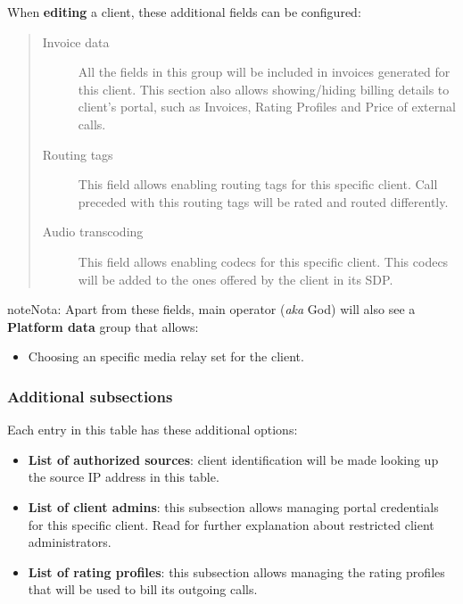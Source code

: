 \documentclass[letterpaper,10pt,spanish]{sphinxmanual}
\begin{document}
When \textbf{editing} a client, these additional fields can be configured:
\begin{quote}
\begin{description}
\item[{Invoice data}] \leavevmode
All the fields in this group will be included in invoices generated for this client. This section also allows
showing/hiding billing details to client's portal, such as Invoices, Rating Profiles and Price of external calls.

\item[{Routing tags}] \leavevmode
This field allows enabling routing tags for this specific client. Call preceded with this
routing tags will be rated and routed differently.

\item[{Audio transcoding}] \leavevmode
This field allows enabling codecs for this specific client. This codecs will be added to
the ones offered by the client in its SDP.

\end{description}
\end{quote}

\begin{notice}{note}{Nota:}
Apart from these fields, main operator (\emph{aka} God) will also see a \textbf{Platform data} group that allows:
\begin{itemize}
\item {} 
Choosing an specific media relay set for the client.

\end{itemize}
\end{notice}


\subsubsection{Additional subsections}
\label{administration_portal/brand/clients/wholesale:additional-subsections}
Each entry in this table has these additional options:
\begin{itemize}
\item {} 
\textbf{List of authorized sources}: client identification will be made looking up the source IP address in this table.

\item {} 
\textbf{List of client admins}: this subsection allows managing portal credentials for this specific client. Read {\hyperref[api_rest/acls:acls]{}}
for further explanation about restricted client administrators.

\item {} 
\textbf{List of rating profiles}: this subsection allows managing the rating profiles that will be used to bill its outgoing calls.

\end{itemize}
\end{document}
